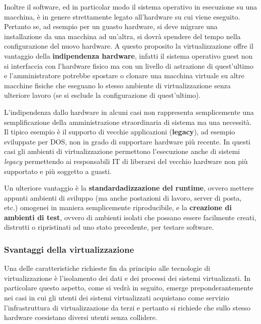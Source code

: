 \documentclass[italian,]{article}
\begin{document}
Inoltre il software, ed in particolar modo il sistema operativo in
esecuzione su una macchina, è in genere strettamente legato all'hardware
su cui viene eseguito. Pertanto se, ad esempio per un guasto hardware,
si deve migrare una installazione da una macchina ad un'altra, si dovrà
spendere del tempo nella configurazione del nuovo hardware. A questo
proposito la virtualizzazione offre il vantaggio della
\textbf{indipendenza hardware}, infatti il sistema operativo guest non
si interfaccia con l'hardware fisico ma con un livello di astrazione di
quest'ultimo e l'amministratore potrebbe spostare o clonare una macchina
virtuale su altre macchine fisiche che eseguano lo stesso ambiente di
virtualizzazione senza ulteriore lavoro (se si esclude la configurazione
di quest'ultimo).

L'indipendenza dallo hardware in alcuni casi non rappresenta
semplicemente una semplificazione della amministrazione straordinaria di
sistema ma una necessità. Il tipico esempio è il supporto di vecchie
applicazioni (\textbf{legacy}), ad esempio sviluppate per DOS, non in
grado di supportare hardware più recente. In questi casi gli ambienti di
virtualizzazione permettono l'esecuzione anche di sistemi \emph{legacy}
permettendo ai responsabili IT di liberarsi del vecchio hardware non più
supportato e più soggetto a guasti.

Un ulteriore vantaggio è la \textbf{standardadizzazione del runtime},
ovvero mettere appunti ambienti di sviluppo (ma anche postazioni di
lavoro, server di posta, etc.) omogenei in maniera semplicemente
riproducibile, e la \textbf{creazione di ambienti di test}, ovvero di
ambienti isolati che possano essere facilmente creati, distrutti o
ripristinati ad uno stato precedente, per testare software.

\subsubsection{Svantaggi della
virtualizzazione}\label{svantaggi-della-virtualizzazione}

Una delle caratteristiche richieste fin da principio alle tecnologie di
virtualizzazione è l'isolamento dei dati e dei processi dei sistemi
virtualizzati. In particolare questo aspetto, come si vedrà in seguito,
emerge preponderantemente nei casi in cui gli utenti dei sistemi
virtualizzati acquistano come servizio l'infrastruttura di
virtualizzazione da terzi e pertanto si richiede che sullo stesso
hardware coesistano diversi utenti senza collidere.
\end{document}

